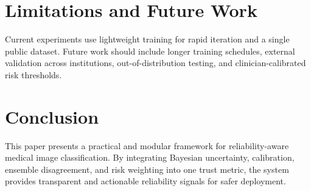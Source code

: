 \documentclass[conference]{IEEEtran}
\begin{document}
\section{Limitations and Future Work}
Current experiments use lightweight training for rapid iteration and a single public dataset. Future work should include longer training schedules, external validation across institutions, out-of-distribution testing, and clinician-calibrated risk thresholds.

\section{Conclusion}
This paper presents a practical and modular framework for reliability-aware medical image classification. By integrating Bayesian uncertainty, calibration, ensemble disagreement, and risk weighting into one trust metric, the system provides transparent and actionable reliability signals for safer deployment.



\end{document}
